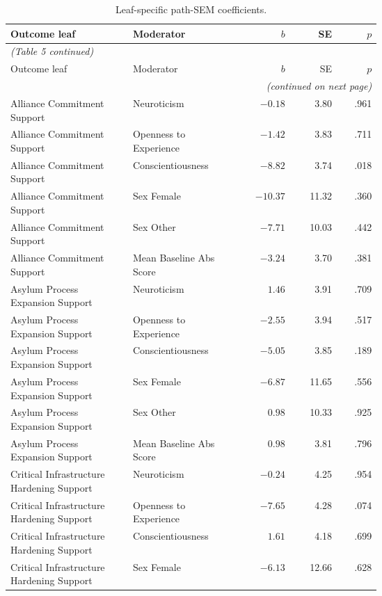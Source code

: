 \footnotesize
\setlength{\tabcolsep}{4pt}
\renewcommand{\arraystretch}{1.10}
\begin{longtable}{@{}p{0.33\linewidth}p{0.29\linewidth}rrr@{}}
\caption{Leaf-specific path-SEM coefficients.}\label{tab:sempaths}\\
\toprule
Outcome leaf & Moderator & $b$ & SE & $p$ \\
\midrule
\endfirsthead
\multicolumn{5}{l}{\footnotesize\textit{(Table 5 continued)}} \\[2pt]
\toprule
Outcome leaf & Moderator & $b$ & SE & $p$ \\
\midrule
\endhead
\midrule
\multicolumn{5}{r}{\footnotesize\textit{(continued on next page)}} \\
\endfoot
\bottomrule
\endlastfoot
Alliance Commitment Support & Neuroticism & $-0.18$ & 3.80 & .961 \\
Alliance Commitment Support & Openness to Experience & $-1.42$ & 3.83 & .711 \\
Alliance Commitment Support & Conscientiousness & $-8.82$ & 3.74 & .018 \\
Alliance Commitment Support & Sex Female & $-10.37$ & 11.32 & .360 \\
Alliance Commitment Support & Sex Other & $-7.71$ & 10.03 & .442 \\
Alliance Commitment Support & Mean Baseline Abs Score & $-3.24$ & 3.70 & .381 \\
\addlinespace
Asylum Process Expansion Support & Neuroticism & $1.46$ & 3.91 & .709 \\
Asylum Process Expansion Support & Openness to Experience & $-2.55$ & 3.94 & .517 \\
Asylum Process Expansion Support & Conscientiousness & $-5.05$ & 3.85 & .189 \\
Asylum Process Expansion Support & Sex Female & $-6.87$ & 11.65 & .556 \\
Asylum Process Expansion Support & Sex Other & $0.98$ & 10.33 & .925 \\
Asylum Process Expansion Support & Mean Baseline Abs Score & $0.98$ & 3.81 & .796 \\
\addlinespace
Critical Infrastructure Hardening Support & Neuroticism & $-0.24$ & 4.25 & .954 \\
Critical Infrastructure Hardening Support & Openness to Experience & $-7.65$ & 4.28 & .074 \\
Critical Infrastructure Hardening Support & Conscientiousness & $1.61$ & 4.18 & .699 \\
Critical Infrastructure Hardening Support & Sex Female & $-6.13$ & 12.66 & .628 \\

\end{longtable}
